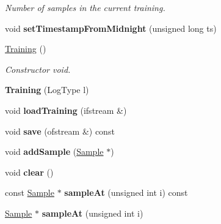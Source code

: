 \begin{DoxyCompactItemize}
\begin{DoxyCompactList}\small\item\em Number of samples in the current training. \end{DoxyCompactList}\item 
\hypertarget{class_training_a94d0694609b43099eade91b194212e85}{void {\bfseries set\-Timestamp\-From\-Midnight} (unsigned long ts)}\label{class_training_a94d0694609b43099eade91b194212e85}

\item 
\hypertarget{class_training_af98b1bc7ed710e2fa008a72ad29dbdae}{\hyperlink{class_training_af98b1bc7ed710e2fa008a72ad29dbdae}{Training} ()}\label{class_training_af98b1bc7ed710e2fa008a72ad29dbdae}

\begin{DoxyCompactList}\small\item\em Constructor void. \end{DoxyCompactList}\item 
\hypertarget{class_training_aaa3229d32dbbddf33db5c66dae89a02d}{{\bfseries Training} (Log\-Type l)}\label{class_training_aaa3229d32dbbddf33db5c66dae89a02d}

\item 
\hypertarget{class_training_a9399c15218729fefd018b7cd3d303319}{void {\bfseries load\-Training} (ifstream \&)}\label{class_training_a9399c15218729fefd018b7cd3d303319}

\item 
\hypertarget{class_training_a53db95eff724d953faaca919708bc10f}{void {\bfseries save} (ofstream \&) const }\label{class_training_a53db95eff724d953faaca919708bc10f}

\item 
\hypertarget{class_training_a3b7366795dfe6861f8db51b8dc4a719e}{void {\bfseries add\-Sample} (\hyperlink{class_sample}{Sample} $\ast$)}\label{class_training_a3b7366795dfe6861f8db51b8dc4a719e}

\item 
\hypertarget{class_training_aa8b430a49b5aaa8410c9288e19f4bbcb}{void {\bfseries clear} ()}\label{class_training_aa8b430a49b5aaa8410c9288e19f4bbcb}

\item 
\hypertarget{class_training_a24c833bf0a60fc96cc09bc86b4de04ba}{const \hyperlink{class_sample}{Sample} $\ast$ {\bfseries sample\-At} (unsigned int i) const }\label{class_training_a24c833bf0a60fc96cc09bc86b4de04ba}

\item 
\hypertarget{class_training_ada77c7d75f23c04619f33dce4a46115d}{\hyperlink{class_sample}{Sample} $\ast$ {\bfseries sample\-At} (unsigned int i)}\label{class_training_ada77c7d75f23c04619f33dce4a46115d}


\end{DoxyCompactItemize}
